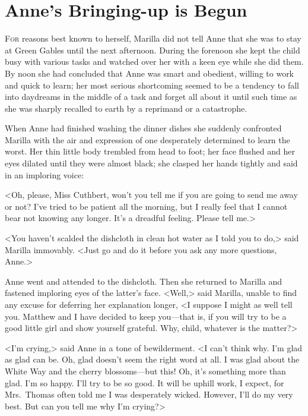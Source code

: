 \chapter{Anne's Bringing-up is Begun}

\lettrine[]{F}{or} reasons best known to herself, Marilla did not tell Anne that she was to stay at Green Gables until the next afternoon. During the forenoon she kept the child busy with various tasks and watched over her with a keen eye while she did them. By noon she had concluded that Anne was smart and obedient, willing to work and quick to learn; her most serious shortcoming seemed to be a tendency to fall into daydreams in the middle of a task and forget all about it until such time as she was sharply recalled to earth by a reprimand or a catastrophe.

When Anne had finished washing the dinner dishes she suddenly confronted Marilla with the air and expression of one desperately determined to learn the worst. Her thin little body trembled from head to foot; her face flushed and her eyes dilated until they were almost black; she clasped her hands tightly and said in an imploring voice:

<Oh, please, Miss Cuthbert, won't you tell me if you are going to send me away or not? I've tried to be patient all the morning, but I really feel that I cannot bear not knowing any longer. It's a dreadful feeling. Please tell me.>

<You haven't scalded the dishcloth in clean hot water as I told you to do,> said Marilla immovably. <Just go and do it before you ask any more questions, Anne.>

Anne went and attended to the dishcloth. Then she returned to Marilla and fastened imploring eyes of the latter's face. <Well,> said Marilla, unable to find any excuse for deferring her explanation longer, <I suppose I might as well tell you. Matthew and I have decided to keep you—that is, if you will try to be a good little girl and show yourself grateful. Why, child, whatever is the matter?>

<I'm crying,> said Anne in a tone of bewilderment. <I can't think why. I'm glad as glad can be. Oh, glad doesn't seem the right word at all. I was glad about the White Way and the cherry blossoms—but this! Oh, it's something more than glad. I'm so happy. I'll try to be so good. It will be uphill work, I expect, for Mrs.~Thomas often told me I was desperately wicked. However, I'll do my very best. But can you tell me why I'm crying?>

